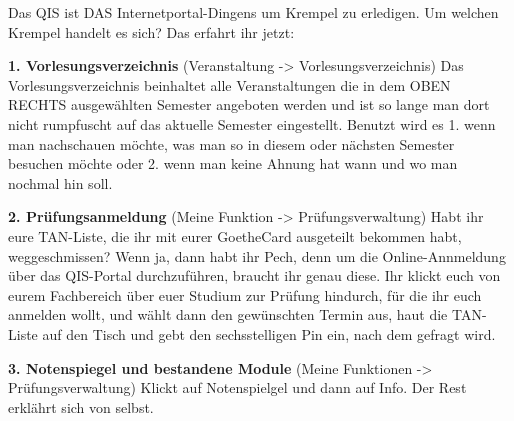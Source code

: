 Das QIS ist DAS Internetportal-Dingens um Krempel zu erledigen.
Um welchen Krempel handelt es sich? Das erfahrt ihr jetzt:

\textbf{1. Vorlesungsverzeichnis} (Veranstaltung -> Vorlesungsverzeichnis)
Das Vorlesungsverzeichnis beinhaltet alle Veranstaltungen die in dem OBEN RECHTS ausgewählten
Semester angeboten werden und ist so lange man dort nicht rumpfuscht auf das aktuelle Semester eingestellt.
Benutzt wird es 1. wenn man nachschauen möchte, was man so in diesem oder nächsten Semester besuchen möchte oder
2. wenn man keine Ahnung hat wann und wo man nochmal hin soll.

\textbf{2. Prüfungsanmeldung} (Meine Funktion -> Prüfungsverwaltung)
Habt ihr eure TAN-Liste, die ihr mit eurer GoetheCard ausgeteilt bekommen habt, weggeschmissen?
Wenn ja, dann habt ihr Pech, denn um die Online-Annmeldung über das QIS-Portal durchzuführen,
braucht ihr genau diese. Ihr klickt euch von eurem Fachbereich über euer Studium zur Prüfung hindurch, für die ihr euch anmelden wollt,
und wählt dann den gewünschten Termin aus, haut die TAN-Liste auf den Tisch und gebt den sechsstelligen Pin ein, nach dem gefragt wird.

\textbf{3. Notenspiegel und bestandene Module} (Meine Funktionen -> Prüfungsverwaltung)
Klickt auf Notenspielgel und dann auf Info. Der Rest erklährt sich von selbst.


